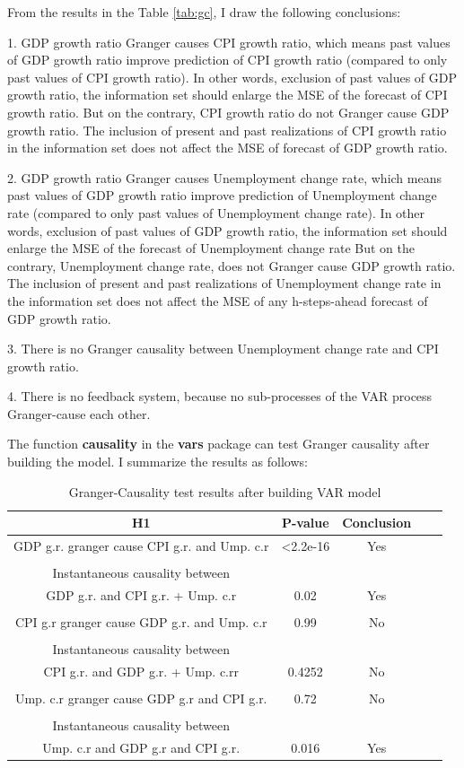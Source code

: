 \documentclass{report}
\begin{document}
From the results in the Table \ref{tab:gc}, I draw the following conclusions:

1. GDP growth ratio  Granger causes CPI growth ratio, which means past values of GDP growth ratio  improve prediction of CPI growth ratio (compared to only past values of CPI growth ratio). In other words, exclusion of past values of GDP growth ratio, the information set should enlarge the MSE of the forecast of CPI growth ratio.
But on the contrary, CPI growth ratio do not Granger cause GDP growth ratio. The inclusion of present and past realizations of CPI growth ratio in the information set does not affect the MSE of forecast of GDP growth ratio.

2. GDP growth ratio  Granger causes Unemployment change rate, which means past values of GDP growth ratio  improve prediction of Unemployment change rate (compared to only past values of Unemployment change rate). In other words, exclusion of past values of GDP growth ratio, the information set should enlarge the MSE of the forecast of Unemployment change rate
But on the contrary, Unemployment change rate, does not Granger cause GDP growth ratio.
The inclusion of present and past realizations of Unemployment change rate in the information set does not affect the MSE of any h-steps-ahead forecast of GDP growth ratio.

3. There is no Granger causality between Unemployment change rate and CPI growth ratio.

4. There is no feedback system, because no sub-processes of the VAR process Granger-cause each other.

The function \textbf{causality} in the \textbf{vars} package can test Granger causality after building the model. I summarize the results as follows:

\begin{table}[H]
\centering
 \caption{\label{tab:gc2} Granger-Causality test results after building VAR model}
 \begin{tabular}{ccccc}
  \toprule
\textbf{H1} & P-value & Conclusion\\
  \midrule
GDP g.r. granger cause CPI g.r. and Ump. c.r & \textless 2.2e-16  & Yes\\
\\
Instantaneous causality between \\GDP g.r. and CPI g.r. + Ump. c.r  & 0.02 & Yes\\
\\

CPI g.r granger cause GDP g.r. and Ump. c.r & 0.99 & No\\
\\
Instantaneous causality between \\CPI g.r. and GDP g.r. + Ump. c.rr & 0.4252 & No\\
\\
Ump. c.r granger cause GDP g.r and CPI g.r.  & 0.72 & No \\
\\
Instantaneous causality between \\ Ump. c.r and GDP g.r and CPI g.r. & 0.016 & Yes\\
  \bottomrule
 \end{tabular}
\end{table}
\end{document}
